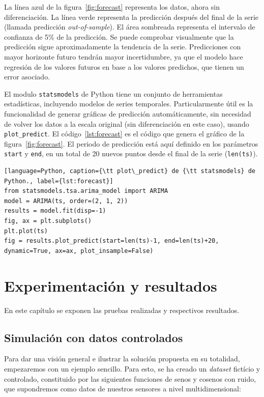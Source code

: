 \documentclass[11pt,spanish,listoffigures,listoftables]{tfgetsinf}
\begin{document}
    La línea azul de la figura~\ref{fig:forecast} representa los datos, ahora sin diferenciación. La línea verde representa la predicción después del final de la serie (llamada predicción {\em out-of-sample}). El área sombreada representa el intervalo de confianza de 5\% de la predicción. Se puede comprobar visualmente que la predicción sigue aproximadamente la tendencia de la serie. Predicciones con mayor horizonte futuro tendrán mayor incertidumbre, ya que el modelo hace regresión de los valores futuros en base a los valores predichos, que tienen un error asociado.

    El modulo {\tt statsmodels} de Python tiene un conjunto de herramientas estadísticas, incluyendo modelos de series temporales. Particularmente útil es la funcionalidad de generar gráficas de predicción automáticamente, sin necesidad de volver los datos a la escala original (sin diferenciación en este caso), usando {\tt plot\_predict}. El código~\ref{lst:forecast} es el código que genera el gráfico de la figura~\ref{fig:forecast}. El periodo de predicción está aquí definido en los parámetros {\tt start} y {\tt end}, en un total de 20 nuevos puntos desde el final de la serie ({\tt len(ts)}).

    \begin{lstlisting}[language=Python, caption={\tt plot\_predict} de {\tt statsmodels} de Python., label={lst:forecast}]
from statsmodels.tsa.arima_model import ARIMA
model = ARIMA(ts, order=(2, 1, 2))
results = model.fit(disp=-1)
fig, ax = plt.subplots()
plt.plot(ts)
fig = results.plot_predict(start=len(ts)-1, end=len(ts)+20, dynamic=True, ax=ax, plot_insample=False)
    \end{lstlisting}


\chapter{Experimentación y resultados}
En este capítulo se exponen las pruebas realizadas y respectivos resultados. 

    \section{Simulación con datos controlados}
    Para dar una visión general e ilustrar la solución propuesta en su totalidad, empezaremos con un ejemplo sencillo. Para esto, se ha creado un {\em dataset} fictício y controlado, constituido por las siguientes funciones de senos y cosenos con ruido, que supondremos como datos de nuestros sensores a nivel multidimensional:
    
\end{document}
